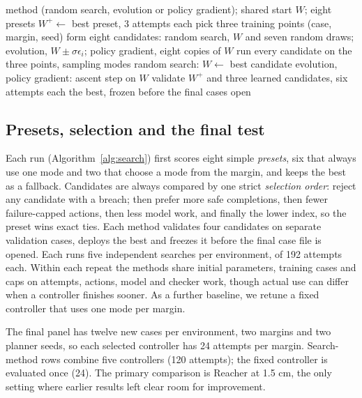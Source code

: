 \documentclass[sigconf,nonacm]{acmart}
\begin{document}
\begin{algorithm}[t]
\caption{One search-and-select run (shared by all methods)}
\label{alg:search}
\small
\begin{algorithmic}[1]
\Require method (random search, evolution or policy gradient); shared
start $W$; eight presets
\State $W^{+}\gets$ best preset, 3 attempts each 
 
  \State pick three training points (case, margin, seed)
  \State form eight candidates: random search, $W$ and seven random draws;
  evolution, $W\pm\sigma\epsilon_i$; policy gradient, eight copies of $W$
  \State run every candidate on the three points, sampling modes
  \State random search: $W\gets$ best candidate
  \State evolution, policy gradient: ascent step on $W$
\EndFor
\State validate $W^{+}$ and three learned candidates, six attempts each
\State \Return the best, frozen before the final cases open
\end{algorithmic}
\end{algorithm}

\subsection{Presets, selection and the final test}
Each run (Algorithm~\ref{alg:search}) first scores eight simple
\emph{presets}, six that always use one mode and two that choose a mode
from the margin, and keeps the best as a fallback. Candidates are always
compared by one strict \emph{selection order}: reject any candidate with a
breach; then prefer more safe completions, then fewer failure-capped
actions, then less model work, and finally the lower index, so the preset
wins exact ties. Each method validates four candidates on separate
validation cases, deploys the best and freezes it before the final case
file is opened. Each runs five independent searches per environment, of 192
attempts each. Within each repeat the methods share initial parameters,
training cases and caps on attempts, actions, model and checker work, though
actual use can differ when a controller finishes sooner. As a further
baseline, we retune a fixed controller that uses one mode per margin.

The final panel has twelve new cases per environment, two margins and two
planner seeds, so each selected controller has 24 attempts per margin.
Search-method rows combine five controllers (120 attempts); the fixed
controller is evaluated once (24). The primary comparison is Reacher at
1.5 cm, the only setting where earlier results left clear room for
improvement.
\end{document}
